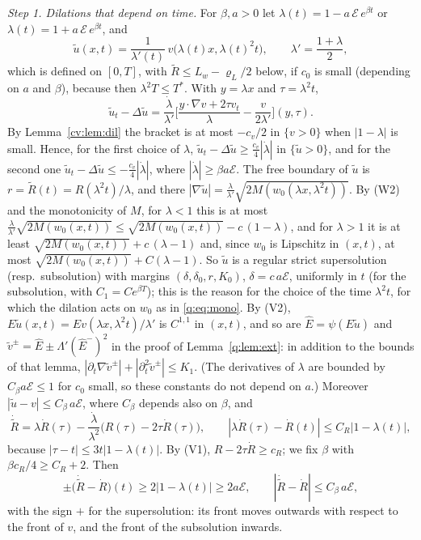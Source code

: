 \documentclass[11pt]{amsart}
\theoremstyle{definition}
\theoremstyle{remark}
\begin{document}
\emph{Step 1. Dilations that depend on time.} For $\beta,a>0$ let
$\lambda(t)=1-a\,\mathcal E\,e^{\beta t}$ or $\lambda(t)=1+a\,\mathcal E\,e^{\beta t}$, and
\[
\tilde u(x,t)=\frac1{\lambda'(t)}\,v\big(\lambda(t)x,\lambda(t)^2t\big),\qquad
\lambda'=\frac{1+\lambda}2,
\]
which is defined on $[0,T]$, with $\tilde R\le L_w-\varrho_L/2$ below, if $c_0$ is small (depending
on $a$ and $\beta$), because then $\lambda^2T\le T^*$. With $y=\lambda x$ and $\tau=\lambda^2t$,
\[
\tilde u_t-\Delta\tilde u=\frac{\dot\lambda}{\lambda'}\Big[\frac{y\cdot\nabla v+2\tau v_t}{\lambda}-\frac v{2\lambda'}\Big](y,\tau).
\]
By Lemma~\ref{cv:lem:dil} the bracket is at most $-c_v/2$ in $\{v>0\}$ when $|1-\lambda|$ is small.
Hence, for the first
choice of $\lambda$, $\tilde u_t-\Delta\tilde u\ge\frac{c_v}4|\dot\lambda|$ in $\{\tilde u>0\}$, and for the second
one $\tilde u_t-\Delta\tilde u\le-\frac{c_v}4|\dot\lambda|$, where $|\dot\lambda|\ge\beta a\mathcal E$. The free boundary
of $\tilde u$ is $r=\tilde R(t)=R(\lambda^2t)/\lambda$, and there
$|\nabla\tilde u|=\frac\lambda{\lambda'}\sqrt{2M(w_0(\lambda x,\lambda^2t))}$. By (W2) and the monotonicity of $M$, for
$\lambda<1$ this is at most $\frac\lambda{\lambda'}\sqrt{2M(w_0(x,t))}\le\sqrt{2M(w_0(x,t))}-c\,(1-\lambda)$, and for
$\lambda>1$ it is at least $\sqrt{2M(w_0(x,t))}+c\,(\lambda-1)$ and, since $w_0$ is Lipschitz in $(x,t)$,
at most $\sqrt{2M(w_0(x,t))}+C(\lambda-1)$. So
$\tilde u$ is a regular strict supersolution (resp.\ subsolution) with margins
$(\delta,\delta_0,r,K_0)$, $\delta=c\,a\mathcal E$, uniformly in $t$ (for the subsolution, with
$C_1=Ce^{\beta T}$); this is the reason for the choice of the time $\lambda^2t$, for which the
dilation acts on $w_0$ as in \eqref{q:eq:mono}. By (V2),
$E\tilde u(x,t)=Ev(\lambda x,\lambda^2t)/\lambda'$ is $C^{1,1}$ in $(x,t)$, and so are
$\hat E=\psi(E\tilde u)$ and $\tilde v^\pm=\hat E\pm\Lambda'(\hat E^-)^2$ in the proof of
Lemma~\ref{q:lem:ext}: in addition to the bounds of that lemma,
$|\partial_t\nabla\tilde v^\pm|+|\partial_t^2\tilde v^\pm|\le K_1$. (The derivatives of $\lambda$ are bounded by
$C_\beta a\mathcal E\le1$ for $c_0$ small, so these constants do not depend on $a$.) Moreover
$|\tilde u-v|\le C_\beta\,a\mathcal E$, where $C_\beta$ depends also on $\beta$, and
\[
\dot{\tilde R}=\lambda\dot R(\tau)-\frac{\dot\lambda}{\lambda^2}\big(R(\tau)-2\tau\dot R(\tau)\big),\qquad
|\lambda\dot R(\tau)-\dot R(t)|\le C_R|1-\lambda(t)| ,
\]
because $|\tau-t|\le3t|1-\lambda(t)|$. By (V1), $R-2\tau\dot R\ge c_R$; we fix $\beta$ with
$\beta c_R/4\ge C_R+2$. Then
\begin{equation}\label{cv:eq:speed}
\pm\big(\dot{\tilde R}-\dot R\big)(t)\ge2|1-\lambda(t)|\ge2a\mathcal E,\qquad|\dot{\tilde R}-\dot R|\le C_\beta\,a\mathcal E,
\end{equation}
with the sign $+$ for the supersolution: its front moves outwards with respect to the
front of $v$, and the front of the subsolution inwards.
\end{document}
